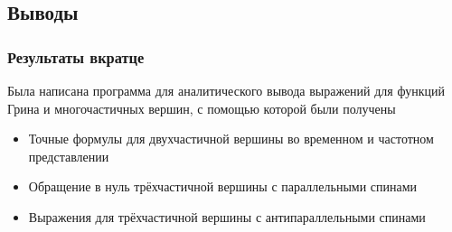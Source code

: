 \documentclass{beamer}
\begin{document}
\subsection{Выводы}
\begin{frame}
 \frametitle{Результаты вкратце}
 \pause
 Была написана программа для аналитического вывода выражений для функций Грина и многочастичных вершин, 
  с помощью которой были получены
 \begin{itemize}
  \item Точные формулы для двухчастичной вершины во временном и частотном представлении \pause
  \item Обращение в нуль трёхчастичной вершины с параллельными спинами \pause
  \item Выражения для трёхчастичной вершины с антипараллельными спинами
 \end{itemize}
\end{frame}
\end{document}

